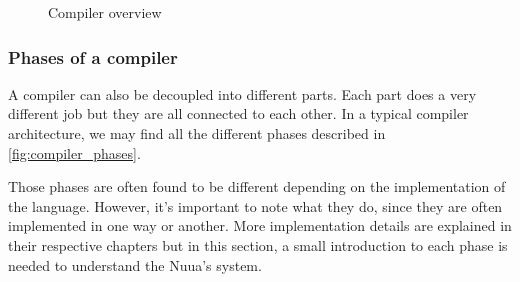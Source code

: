 \begin{figure}[H]
    \centering

    \caption{Compiler overview}
    \label{fig:compiler_overview}
\end{figure}

\subsubsection{Phases of a compiler}

A compiler can also be decoupled into different parts. Each part does a very different job but they are all connected to each other.
In a typical compiler architecture, we may find all the different phases described in \autoref{fig:compiler_phases}.

Those phases are often found to be different depending on the implementation of the language. However, it's important to note what they do,
since they are often implemented in one way or another. More implementation details are explained in their respective chapters but in this
section, a small introduction to each phase is needed to understand the Nuua's system.

